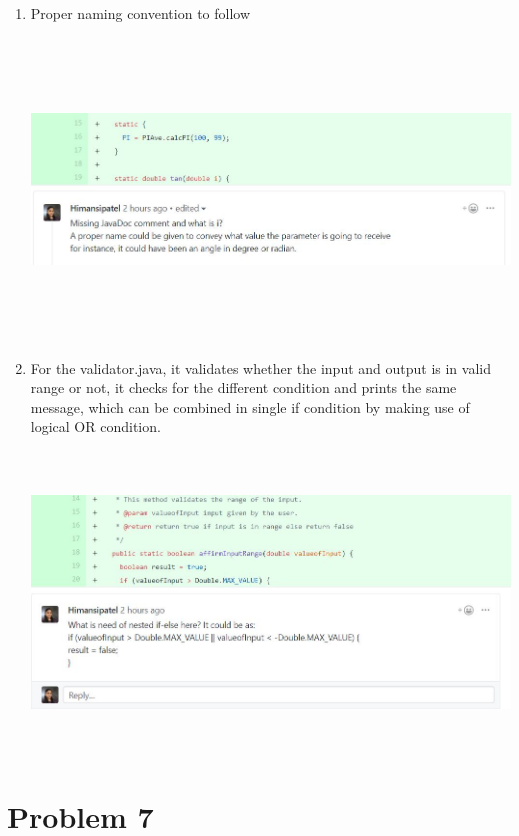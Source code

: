 \documentclass[a4paper,11pt]{report}
\begin{document}
\begin{enumerate}
    \item Proper naming convention to follow
    \begin{center}
    \includegraphics[width=16cm, height=8cm]{Image/commentmissing.JPG}
    \end{center}
    
    \item  For the validator.java, it validates whether the input and output is in valid range or not, it checks for the different condition and prints the same message, which can be combined in single if condition by making use of logical OR condition.
    \begin{center}
    \includegraphics[width=16cm, height=8cm]{Image/reduceif.JPG}
    \end{center}
    
\end{enumerate}
\newpage

\section{Problem 7}
\end{document}
